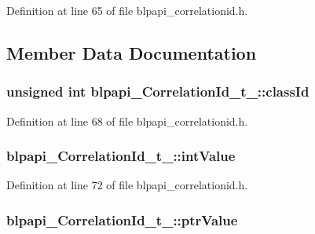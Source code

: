 Definition at line 65 of file blpapi\+\_\+correlationid.\+h.



\subsection{Member Data Documentation}
\subsubsection[{\texorpdfstring{class\+Id}{classId}}]{\setlength{\rightskip}{0pt plus 5cm}unsigned int blpapi\+\_\+\+Correlation\+Id\+\_\+t\+\_\+\+::class\+Id}\hypertarget{structblpapi___correlation_id__t___abd17f7805ce2ed86072862ab07c6225e}{}\label{structblpapi___correlation_id__t___abd17f7805ce2ed86072862ab07c6225e}


Definition at line 68 of file blpapi\+\_\+correlationid.\+h.

\subsubsection[{\texorpdfstring{int\+Value}{intValue}}]{ blpapi\+\_\+\+Correlation\+Id\+\_\+t\+\_\+\+::int\+Value}\hypertarget{structblpapi___correlation_id__t___a7fd476d7c55a9be437ce6b57d9125705}{}\label{structblpapi___correlation_id__t___a7fd476d7c55a9be437ce6b57d9125705}


Definition at line 72 of file blpapi\+\_\+correlationid.\+h.

\subsubsection[{\texorpdfstring{ptr\+Value}{ptrValue}}]{ blpapi\+\_\+\+Correlation\+Id\+\_\+t\+\_\+\+::ptr\+Value}\hypertarget{structblpapi___correlation_id__t___a0f7141d09f25f178eaebff1e2986e64c}{}\label{structblpapi___correlation_id__t___a0f7141d09f25f178eaebff1e2986e64c}


